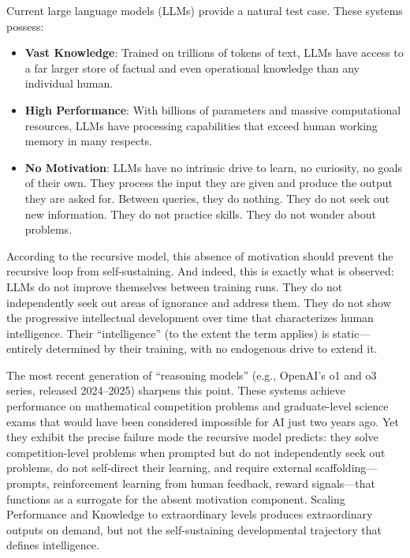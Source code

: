 \documentclass[12pt,a4paper]{article}
\begin{document}
Current large language models (LLMs) provide a natural test case. These systems possess:

\begin{itemize}
\item \textbf{Vast Knowledge}: Trained on trillions of tokens of text, LLMs have access to a far larger store of factual and even operational knowledge than any individual human.

\item \textbf{High Performance}: With billions of parameters and massive computational resources, LLMs have processing capabilities that exceed human working memory in many respects.

\item \textbf{No Motivation}: LLMs have no intrinsic drive to learn, no curiosity, no goals of their own. They process the input they are given and produce the output they are asked for. Between queries, they do nothing. They do not seek out new information. They do not practice skills. They do not wonder about problems.
\end{itemize}

According to the recursive model, this absence of motivation should prevent the recursive loop from self-sustaining. And indeed, this is exactly what is observed: LLMs do not improve themselves between training runs. They do not independently seek out areas of ignorance and address them. They do not show the progressive intellectual development over time that characterizes human intelligence. Their ``intelligence'' (to the extent the term applies) is static---\hspace{0pt}entirely determined by their training, with no endogenous drive to extend it.

The most recent generation of ``reasoning models'' (e.g., OpenAI's o1 and o3 series, released 2024–2025) sharpens this point. These systems achieve performance on mathematical competition problems and graduate-level science exams that would have been considered impossible for AI just two years ago. Yet they exhibit the precise failure mode the recursive model predicts: they solve competition-level problems when prompted but do not independently seek out problems, do not self-direct their learning, and require external scaffolding---\hspace{0pt}prompts, reinforcement learning from human feedback, reward signals---\hspace{0pt}that functions as a surrogate for the absent motivation component. Scaling Performance and Knowledge to extraordinary levels produces extraordinary outputs on demand, but not the self-sustaining developmental trajectory that defines intelligence.
\end{document}
